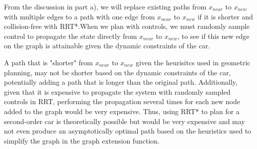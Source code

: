 \documentclass[11pt]{article}
\begin{document}
\begin{enumerate}[leftmargin=0.3in]
\begin{enumerate}
           From the discussion in part a), we will replace existing paths from $x_{near}$ to $x_{new}$ with multiple edges to a path with one edge from $x_{near}$ to $x_{new}$ if it is shorter and collision-free with RRT*.When we plan with controls, we must randomly sample control to propagate the state directly from $x_{near}$ to $x_{new}$, to see if this new edge on the graph is attainable given the dynamic constraints of the car. 

           A path that is "shorter" from $x_{near}$ to $x_{new}$ given the heurisitcs used in geometric planning, may not be shorter based on the dynamic constraints of the car, potentially adding a path that is longer than the original path. Additionally, given that it is expensive to propagate the system with randomly sampled controls in RRT, performing the propagation several times for each new node added to the graph would be very expensive. Thus, using RRT* to plan for a second-order car is theoretically possible but would be very expensive and may not even produce an asymptotically optimal path based on the heuristics used to simplify the graph in the graph extension function.

   \end{enumerate} %


\end{enumerate}
\end{document}
